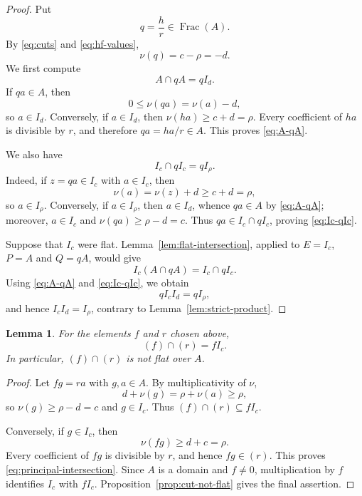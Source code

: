 \documentclass[12pt]{amsart}
\newtheorem{lemma}[theorem]{Lemma}
\theoremstyle{plain}
\newcommand{\Frac}{\operatorname{Frac}}
\begin{document}
\begin{proof}
Put
\[
  q=\frac{h}{r}\in\Frac(A).
\]
By \eqref{eq:cuts} and \eqref{eq:hf-values},
\[
  \nu(q)=c-\rho=-d.
\]
We first compute
\begin{equation}\label{eq:A-qA}
  A\cap qA=qI_d.
\end{equation}
If $qa\in A$, then
\[
  0\leq\nu(qa)=\nu(a)-d,
\]
so $a\in I_d$. Conversely, if $a\in I_d$, then
$\nu(ha)\geq c+d=\rho$. Every coefficient of $ha$ is divisible by
$r$, and therefore $qa=ha/r\in A$. This proves
\eqref{eq:A-qA}.

We also have
\begin{equation}\label{eq:Ic-qIc}
  I_c\cap qI_c=qI_\rho.
\end{equation}
Indeed, if $z=qa\in I_c$ with $a\in I_c$, then
\[
  \nu(a)=\nu(z)+d\geq c+d=\rho,
\]
so $a\in I_\rho$. Conversely, if $a\in I_\rho$, then
$a\in I_d$, whence $qa\in A$ by \eqref{eq:A-qA}; moreover,
$a\in I_c$ and $\nu(qa)\geq\rho-d=c$. Thus
$qa\in I_c\cap qI_c$, proving \eqref{eq:Ic-qIc}.

Suppose that $I_c$ were flat. Lemma~\ref{lem:flat-intersection},
applied to $E=I_c$, $P=A$ and $Q=qA$, would give
\[
  I_c(A\cap qA)=I_c\cap qI_c.
\]
Using \eqref{eq:A-qA} and \eqref{eq:Ic-qIc}, we obtain
\[
  qI_cI_d=qI_\rho,
\]
and hence $I_cI_d=I_\rho$, contrary to
Lemma~\ref{lem:strict-product}.
\end{proof}

\begin{lemma}\label{lem:principal-intersection}
For the elements $f$ and $r$ chosen above,
\begin{equation}\label{eq:principal-intersection}
  (f)\cap(r)=fI_c.
\end{equation}
In particular, $(f)\cap(r)$ is not flat over $A$.
\end{lemma}

\begin{proof}
Let $fg=ra$ with $g,a\in A$. By multiplicativity of $\nu$,
\[
  d+\nu(g)=\rho+\nu(a)\geq\rho,
\]
so $\nu(g)\geq\rho-d=c$ and $g\in I_c$. Thus
$(f)\cap(r)\subseteq fI_c$.

Conversely, if $g\in I_c$, then
\[
  \nu(fg)\geq d+c=\rho.
\]
Every coefficient of $fg$ is divisible by $r$, and hence
$fg\in(r)$. This proves \eqref{eq:principal-intersection}. Since
$A$ is a domain and $f\neq0$, multiplication by $f$ identifies $I_c$
with $fI_c$. Proposition~\ref{prop:cut-not-flat} gives the final
assertion.
\end{proof}
\end{document}

